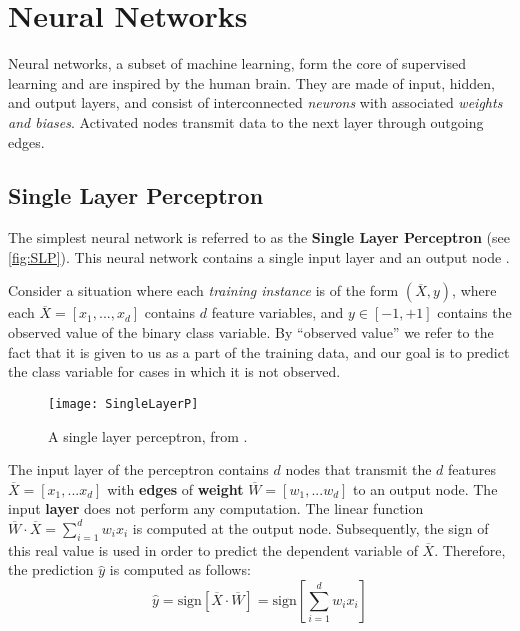 \documentclass{article}
\begin{document}
\section{Neural Networks}
Neural networks, a subset of machine learning, form the core of supervised learning and are inspired by the human brain. They are made of input, hidden, and output layers, and consist of interconnected \textit{neurons} with associated \textit{weights and biases}. Activated nodes transmit data to the next layer through outgoing edges.

\subsection{Single Layer Perceptron} \label{sub:Single Layer Perceptron}
The simplest neural network is referred to as the \textbf{Single Layer Perceptron} (see \autoref{fig:SLP}). This neural network contains
a single input layer and an output node \citep{inbook:Aggarwal-1.2}.

Consider a situation where each \textit{training instance} is of the form $(\overline{X}, y)$, where each $\overline{X} = [x_1,..., x_d]$ contains $d$ feature variables, and $y \in [-1, +1]$ contains the observed value of the binary class variable. By “observed value” we refer to the fact that it is given to us as a part of the training data, and our goal is to predict the class variable for cases in which it is not observed.

\begin{wrapfigure}{R}{0.4\textwidth} %
    \centering
    \texttt{[image: SingleLayerP]}
    \caption{A single layer perceptron, from \cite{inbook:Aggarwal-1.2}.}
    \label{fig:SLP}
\end{wrapfigure}

The input layer of the {perceptron} contains $d$ nodes that transmit the $d$ features $\overline{X} = [x_1, . . . x_d]$ with \textbf{edges} of \textbf{weight} $\overline{W} = [w_1, . . . w_d]$  to an output node. The input \textbf{layer} does not perform any computation. The linear function $\overline{W} \cdot \overline{X} =\sum^{d}_{i=1}  w_ix_i$ is computed at the output node. Subsequently, the sign of this real value is used in order to predict the dependent variable of $\overline{X}$. Therefore, the prediction $\hat y$ is computed as follows:
    $$\hat y = \text{sign}[\overline{X} \cdot \overline{W}] =\text{sign}\left[\sum^{d}_{i=1}  w_ix_i\right] $$
\end{document}

